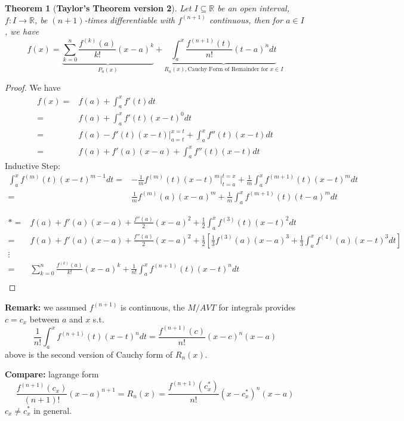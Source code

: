 \documentclass[12pt]{article}
\theoremstyle{plain}
\newtheorem{theorem}{Theorem}[subsection]
\newcommand{\mR}{{\mathbb{R}}}
\begin{document}
\begin{theorem}[\textbf{Taylor's Theorem version 2}]
	Let $I \subseteq \mR$ be an open interval, $f:I\to \mR$, be $(n+1)$-times
	differentiable with $f^{(n+1)}$ continuous, then for $a \in I$, we have 
	\[
		f(x) = \underbrace{\sum_{k=0}^n \frac{f^{(k)}(a)}{k!} (x-a)^k}_{P_n(x)}
		+ \underbrace{\int_a^x \frac{f^{(n+1)}(t)}{n!} (t-a)^n dt}
		_{R_n(x), \text{Cauchy Form of Remainder for } x\in I }
	\]
\end{theorem}
\begin{proof}
	We have 
	\begin{align*}
		f(x) 
		=& f(a) + \int_a^x f'(t) dt \tag{F.T. of C}\\
		=& f(a) + \int_a^x f'(t)(x-t)^0 dt\\
		=& f(a) - f'(t)(x-t)\bigg\vert_{a=t}^{x=t} + \int_a^x f''(t)(x-t)dt
		\tag{Integration by Parts}\\
		=& f(a) + f'(a)(x-a) + \int_a^x f''(t)(x-t)dt \tag{*}
	\end{align*}
	Inductive Step: 
	\begin{align*}
		\int_a^x f^{(m)}(t) (x-t)^{m-1}dt
		=& -\frac 1m f^{(m)}(t) (x-t)^m \bigg\vert_{t=a}^{t=x}
		+ \frac 1m \int_a^x f^{(m+1)}(t)(x-t)^m dt\\
		=& \frac 1m f^{(m)}(a)(x-a)^m + \frac 1m \int_a^x f^{(m+1)}(t)(t-a)^mdt
	\end{align*}

	\begin{align*}
		* 
		=& f(a) + f'(a)(x-a) + \frac{f''(a)}2 (x-a)^2 + \frac 12 \int_a^x 
		f^{(3)}(t) (x-t)^2 dt\\
		=& f(a) + f'(a)(x-a) + \frac{f''(a)}2(x-a)^2 + \frac 12 [\frac 13 
		f^{(3)}(a)(x-a)^3 + \frac 13 \int_a^x f^{(4)}(a)(x-t)^3 dt] \\
		\vdots &\\
		=& \sum_{k=0}^n \frac{f^{(k)}(a)}{k!} (x-a)^k + \frac 1{n!} \int_a^x
		f^{(n+1)}(t)(x-t)^n dt\\
	\end{align*}
\end{proof}

\textbf{Remark: } we assumed $f^{(n+1)}$ is continuous, the $M/AVT$ for
integrals provides $c = c_x$ between $a$ and $x$ s.t. 
\[
	\frac1{n!} \int_a^x f^{(n+1)}(t)(x-t)^n dt = \frac{f^{(n+1)}(c)}{n!}
	(x-c)^n (x-a) 
\]
above is the second version of Cauchy form of $R_n(x)$.

\textbf{Compare:} lagrange form
\[
	\frac{f^{(n+1)}(c_x)}{(n+1)!} (x-a)^{n+1} = R_n(x) 
	= \frac{f^{(n+1)}(c_x^*)}{n!} (x-c_x^*)^n(x-a) 
\]
$c_x \neq c_x^*$ in general. \\
\end{document}
